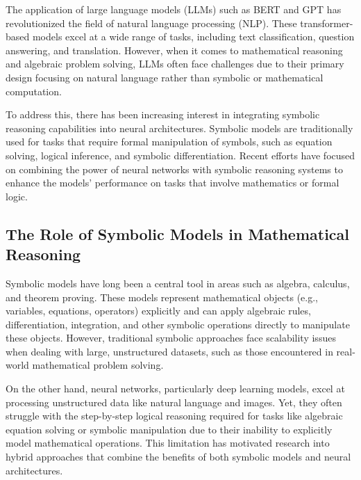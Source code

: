 \documentclass{article}
\begin{document}

The application of large language models (LLMs) such as BERT \cite{mathBERT} and GPT \cite{Brown_et_al._2020} has revolutionized the field of natural language processing (NLP). These transformer-based models excel at a wide range of tasks, including text classification, question answering, and translation. However, when it comes to mathematical reasoning and algebraic problem solving, LLMs often face challenges due to their primary design focusing on natural language rather than symbolic or mathematical computation.

To address this, there has been increasing interest in integrating symbolic reasoning capabilities into neural architectures. Symbolic models are traditionally used for tasks that require formal manipulation of symbols, such as equation solving, logical inference, and symbolic differentiation. Recent efforts have focused on combining the power of neural networks with symbolic reasoning systems to enhance the models' performance on tasks that involve mathematics or formal logic.

\subsection{The Role of Symbolic Models in Mathematical Reasoning}

Symbolic models have long been a central tool in areas such as algebra, calculus, and theorem proving. These models represent mathematical objects (e.g., variables, equations, operators) explicitly and can apply algebraic rules, differentiation, integration, and other symbolic operations directly to manipulate these objects. However, traditional symbolic approaches face scalability issues when dealing with large, unstructured datasets, such as those encountered in real-world mathematical problem solving. 

On the other hand, neural networks, particularly deep learning models, excel at processing unstructured data like natural language and images. Yet, they often struggle with the step-by-step logical reasoning required for tasks like algebraic equation solving or symbolic manipulation due to their inability to explicitly model mathematical operations. This limitation has motivated research into hybrid approaches that combine the benefits of both symbolic models and neural architectures.
\end{document}
